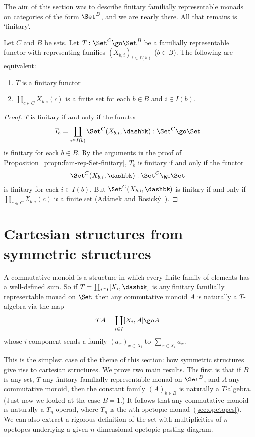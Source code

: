 The aim of this section was to describe finitary familially representable
monads on categories of the form $\Set^B$, and we are nearly there.  All
that remains is `finitary'.%
%
%
\begin{propn}	
Let $C$ and $B$ be sets.  Let $T: \Set^C \go \Set^B$ be a familially
representable functor with representing families $(X_{b,i})_{i\in I(b)}$
($b\in B$).  The following
are equivalent:
%
\begin{enumerate}
\item	{}
$T$ is a finitary functor
\item	{}
$\coprod_{c\in C} X_{b,i} (c)$ is a finite set for each $b\in B$ and $i\in
I(b)$. 
\end{enumerate}
\end{propn}
%
\begin{proof}
$T$ is finitary if and only if the functor
\[
T_b = \coprod_{i\in I(b)} \Set^C (X_{b,i}, \dashbk): 	
\Set^C	\go \Set
\]
is finitary for each $b\in B$.  By the arguments in the proof of
Proposition~\ref{propn:fam-rep-Set-finitary}, $T_b$ is finitary if and only
if the functor
\[
\Set^C (X_{b,i}, \dashbk): \Set^C \go \Set
\]
is finitary for each $i\in I(b)$.  But $\Set^C (X_{b,i}, \dashbk)$ is
finitary if and only if $\coprod_{c\in C} X_{b,i}(c)$ is a finite set
(Ad\'amek%
%
%
and Rosick\'y~\cite[p.~9]{AR}).%
%
%
 \done
\end{proof}




\section{Cartesian structures from symmetric structures}
%
%
%

A commutative monoid is a structure in which every finite family of
elements has a well-defined sum.  So if $T = \coprod_{i\in I} [X_i,
\dashbk]$ is any finitary familially representable monad on $\Set$ then any
commutative monoid $A$ is naturally a $T$-algebra via the map
\[
TA = \coprod_{i\in I} [X_i, A] \go A
\]
whose $i$-component sends a family $(a_x)_{x\in X_i}$ to $\sum_{x\in X_i}
a_x$.  

This is the simplest case of the theme of this section: how symmetric
structures give rise to cartesian structures.  We prove two main results.
The first is that if $B$ is any set, $T$ any finitary familially
representable monad on $\Set^B$, and $A$ any commutative monoid, then the
constant family $(A)_{b\in B}$ is naturally a $T$-algebra.  (Just now we
looked at the case $B=1$.)  It follows that any commutative monoid is
naturally a $T_n$-operad, where $T_n$ is the $n$th opetopic
monad~(\ref{sec:opetopes}).  We can also extract a rigorous definition of
the set-with-multiplicities of $n$-opetopes underlying a given
$n$-dimensional opetopic pasting diagram.

